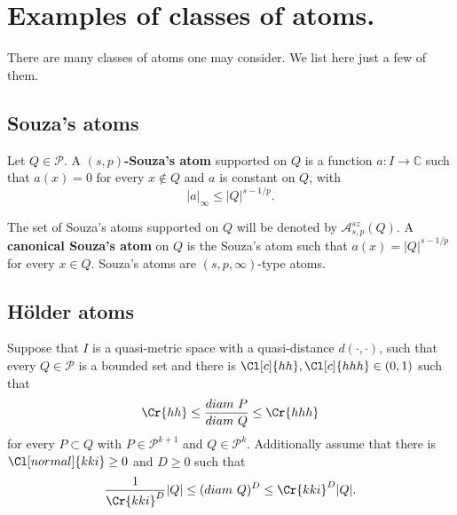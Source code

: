 \documentclass{amsart}
\newtheorem{proposition}[theorem]{Proposition}
\theoremstyle{definition}
\newcommand{\SB}{{\mathcal B}}
\newcommand{\Cll}[2][normal]{\Cl[#1]{#2}}
\newcommand{\Crr}[1]{\Cr{#1}}
\begin{document}
\section{Examples of classes of atoms.}\label{secatom}

There are many classes of atoms one may consider. We list here just  a few of them. 


\subsection{Souza's  atoms}\label{souzaa}

Let $Q\in \mathcal{P}$. A {\bf $(s,p)$-Souza's atom}  supported  on $Q$ is a function $a\colon I \rightarrow \mathbb{C}$ such that $a(x)=0$ for every $x \not\in Q$ and $a$ is constant on $Q$, with 
$$|a|_\infty\leq |Q|^{s-1/p}.$$

The set of Souza's atoms supported  on $Q$ will be denoted by $\mathcal{A}^{sz}_{s,p}(Q).$ A {\bf canonical Souza's atom} on $Q$ is the Souza's atom such that  $a(x)= |Q|^{s-1/p}$ for every $x \in Q$.  Souza's atoms are $(s,p,\infty)$-type atoms.











 \subsection{H\"older atoms} \label{hatoms} Suppose that $I$ is a quasi-metric space with a quasi-distance $d(\cdot,\cdot)$, such that every $Q\in \mathcal{P}$ is a bounded set and there is $\Cll[c]{hh},\Cll[c]{hhh} \in (0,1)$ such that
$$\Crr{hh} \leq \frac{diam \ P}{diam \ Q} \leq \Crr{hhh}$$
for every $P\subset Q$ with $P \in \mathcal{P}^{k+1}$ and $Q \in \mathcal{P}^{k}$.  Additionally assume  that there is $\Cll{kki}\geq 0$ and $D\geq 0$ such that 
$$\frac{1}{\Crr{kki}^{D}}|Q| \leq (diam \ Q)^D \leq \Crr{kki}^{D} |Q|.$$
\end{document}
